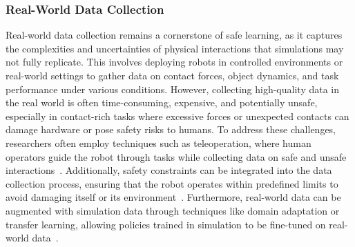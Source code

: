 \documentclass[Afour,sageh,times]{template/sagej}
\begin{document}
\subsubsection{Real-World Data Collection}
Real-world data collection remains a cornerstone of safe learning, as it captures the complexities and uncertainties of physical interactions that simulations may not fully replicate. This involves deploying robots in controlled environments or real-world settings to gather data on contact forces, object dynamics, and task performance under various conditions.
However, collecting high-quality data in the real world is often time-consuming, expensive, and potentially unsafe, especially in contact-rich tasks where excessive forces or unexpected contacts can damage hardware or pose safety risks to humans. To address these challenges, researchers often employ techniques such as teleoperation, where human operators guide the robot through tasks while collecting data on safe and unsafe interactions~\cite{mower2023ros, 354}. 
Additionally, safety constraints can be integrated into the data collection process, ensuring that the robot operates within predefined limits to avoid damaging itself or its environment~\cite{5, 18}.
Furthermore, real-world data can be augmented with simulation data through techniques like domain adaptation or transfer learning, allowing policies trained in simulation to be fine-tuned on real-world data~\cite{zhang2024srl, berrocal2024evaluating}.
\end{document}
